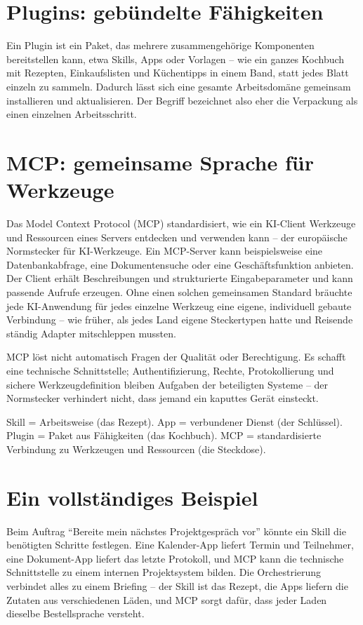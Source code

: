 \section{Plugins: gebündelte Fähigkeiten}

Ein Plugin ist ein Paket, das mehrere zusammengehörige Komponenten bereitstellen kann, etwa Skills, Apps oder Vorlagen -- wie ein ganzes Kochbuch mit Rezepten, Einkaufslisten und Küchentipps in einem Band, statt jedes Blatt einzeln zu sammeln. Dadurch lässt sich eine gesamte Arbeitsdomäne gemeinsam installieren und aktualisieren. Der Begriff bezeichnet also eher die Verpackung als einen einzelnen Arbeitsschritt.

\section{MCP: gemeinsame Sprache für Werkzeuge}

Das Model Context Protocol (MCP) standardisiert, wie ein KI-Client Werkzeuge und Ressourcen eines Servers entdecken und verwenden kann -- der europäische Normstecker für KI-Werkzeuge. Ein MCP-Server kann beispielsweise eine Datenbankabfrage, eine Dokumentensuche oder eine Geschäftsfunktion anbieten. Der Client erhält Beschreibungen und strukturierte Eingabeparameter und kann passende Aufrufe erzeugen. Ohne einen solchen gemeinsamen Standard bräuchte jede KI-Anwendung für jedes einzelne Werkzeug eine eigene, individuell gebaute Verbindung -- wie früher, als jedes Land eigene Steckertypen hatte und Reisende ständig Adapter mitschleppen mussten.

MCP löst nicht automatisch Fragen der Qualität oder Berechtigung. Es schafft eine technische Schnittstelle; Authentifizierung, Rechte, Protokollierung und sichere Werkzeugdefinition bleiben Aufgaben der beteiligten Systeme -- der Normstecker verhindert nicht, dass jemand ein kaputtes Gerät einsteckt.

\begin{merke}
Skill = Arbeitsweise (das Rezept). App = verbundener Dienst (der Schlüssel). Plugin = Paket aus Fähigkeiten (das Kochbuch). MCP = standardisierte Verbindung zu Werkzeugen und Ressourcen (die Steckdose).
\end{merke}

\section{Ein vollständiges Beispiel}

Beim Auftrag ``Bereite mein nächstes Projektgespräch vor'' könnte ein Skill die benötigten Schritte festlegen. Eine Kalender-App liefert Termin und Teilnehmer, eine Dokument-App liefert das letzte Protokoll, und MCP kann die technische Schnittstelle zu einem internen Projektsystem bilden. Die Orchestrierung verbindet alles zu einem Briefing -- der Skill ist das Rezept, die Apps liefern die Zutaten aus verschiedenen Läden, und MCP sorgt dafür, dass jeder Laden dieselbe Bestellsprache versteht.

